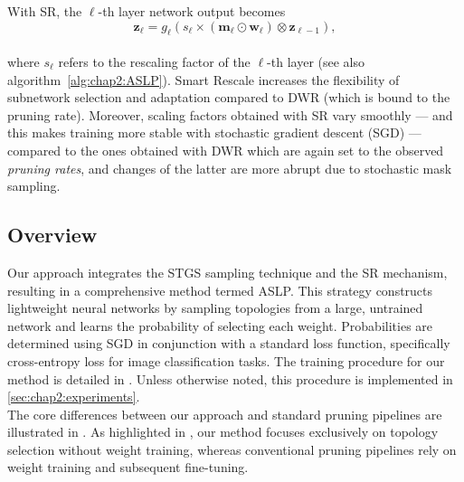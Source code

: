 With SR, the $\ell$-th layer network output becomes \\

  \begin{equation}
   \mathbf{z}_{\ell} = g_\ell(s_\ell \times (\bm{m}_\ell \odot \bm{w}_\ell) \otimes \mathbf{z}_{\ell-1}),
  \end{equation}\\

\noindent where  $s_\ell$ refers to the rescaling factor  of  the $\ell$-th
layer (see also algorithm~\ref{alg:chap2:ASLP}).  Smart Rescale increases
the flexibility of subnetwork selection and adaptation compared to DWR (which
is bound to the pruning rate).  Moreover,  scaling factors obtained with SR
vary smoothly  ---  and this makes training more stable with stochastic
gradient descent (SGD) --- compared to the ones obtained with DWR which are
again set to the observed {\it pruning rates},  and changes of the latter are
more abrupt due to stochastic mask sampling. \\


\subsection{Overview}

Our approach integrates the \acl{STGS} sampling technique and the \acl{SR}
mechanism, resulting in a comprehensive method termed \acf{ASLP}. This strategy
constructs lightweight neural networks by sampling topologies from a large,
untrained network and learns the probability of selecting each weight.
Probabilities are determined using \acl{SGD} in conjunction with a standard loss
function, specifically cross-entropy loss for image classification tasks. The
training procedure for our method is detailed in . Unless
otherwise noted, this procedure is implemented in
\cref{sec:chap2:experiments}.\\

The core differences between our approach and standard pruning pipelines are
illustrated in . As
highlighted in , our method focuses exclusively on
topology selection without weight training, whereas conventional pruning
pipelines rely on weight training and subsequent fine-tuning.\\


